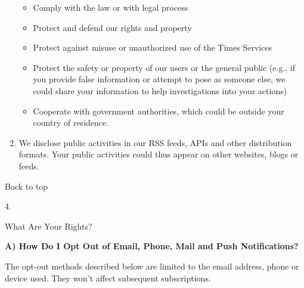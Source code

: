 \begin{enumerate}
  \begin{itemize}
  \tightlist
  \item
    Comply with the law or with legal process
  \item
    Protect and defend our rights and property
  \item
    Protect against misuse or unauthorized use of the Times Services
  \item
    Protect the safety or property of our users or the general public
    (e.g., if you provide false information or attempt to pose as
    someone else, we could share your information to help investigations
    into your actions)
  \item
    Cooperate with government authorities, which could be outside your
    country of residence.
  \end{itemize}
\item
  We disclose public activities in our RSS feeds, APIs and other
  distribution formats. Your public activities could thus appear on
  other websites, blogs or feeds.
\end{enumerate}

Back to top

4.

What Are Your Rights?

\textbf{A) How Do I Opt Out of Email, Phone, Mail and Push
Notifications?}

The opt-out methods described below are limited to the email address,
phone or device used. They won't affect subsequent subscriptions.

